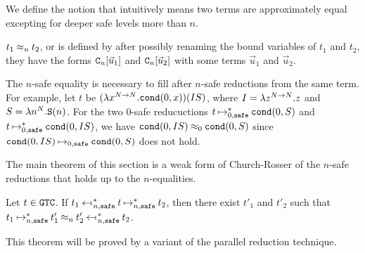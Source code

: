 We define the notion  that intuitively means
two terms are approximately equal excepting for deeper safe levels more than $n$. 

\begin{definition}
  $t_1 \mathbin{\approx_{n}} t_2$, or 
  is defined by after possibly renaming the bound variables of $t_1$ and $t_2$, 
  they have the forms ${\tt C}_{n}[\vec{u}_1]$ and ${\tt C}_{n}[\vec{u}_2]$
  with some terms $\vec{u}_1$ and $\vec{u}_2$. 
\end{definition}

The $n$-safe equality is necessary to fill 
after $n$-safe reductions from the same term.
For example, let $t$ be $(\lambda x^{{N}\to{N}}.{\tt cond}(0,x))(IS)$,
where $I = \lambda z^{{N}\to{N}}.z$ and $S = \lambda n^{N}.{\tt S}(n)$.
For the two $0$-safe reducuctions 
$t \mathbin{\mathbin{\mapsto}_{0,{\hbox{\scriptsize \tt safe}}}^*} {\tt cond}(0,S)$ and $t \mathbin{\mathbin{\mapsto}_{0,{\hbox{\scriptsize \tt safe}}}^*} {\tt cond}(0,IS)$, 
we have ${\tt cond}(0,IS) \mathbin{\approx_{0}} {\tt cond}(0,S)$
since ${\tt cond}(0,IS) \mathbin{\mathbin{\mapsto}_{0,{\hbox{\scriptsize \tt safe}}}} {\tt cond}(0,S)$ does not hold. 

The main theorem of this section is a weak form of Church-Rosser
of the $n$-safe reductions that holds up to the $n$-equalities. 

\begin{theorem}
  Let $t\in {\tt GTC}$.
  If $t_1 \nsafeReducesAstL{n} t \nsafeReducesAst{n} t_2$, 
  then there exist $t'_1$ and $t'_2$ such that
  $t_1 \nsafeReducesAst{n} t'_1 \nequal{n} t'_2 \nsafeReducesAstL{n} t_2$. 
\end{theorem}

This theorem will be proved by a variant of the parallel reduction technique. 

